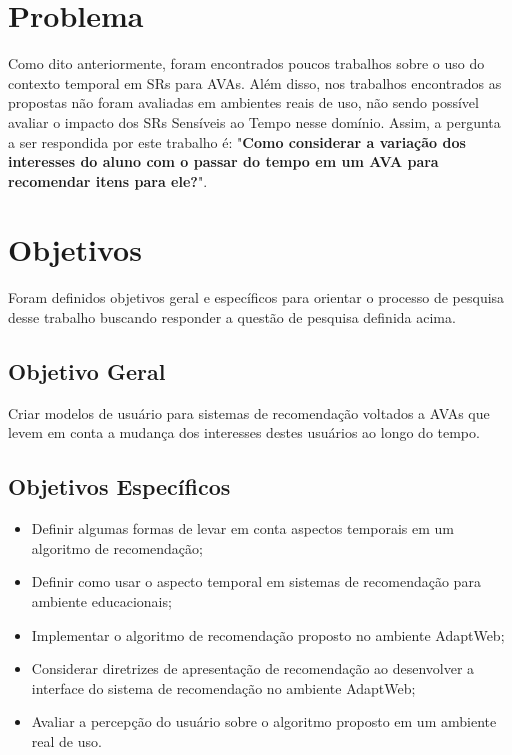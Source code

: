 \section{Problema}

Como dito anteriormente, foram encontrados poucos trabalhos sobre o uso do contexto temporal em SRs para AVAs. Além disso,
nos trabalhos encontrados as propostas não foram avaliadas em ambientes reais de uso, não sendo possível avaliar o
impacto dos SRs Sensíveis ao Tempo nesse domínio. Assim, a pergunta a ser respondida por este trabalho
é: "\textbf{Como considerar a variação dos interesses do aluno com o passar do tempo em um AVA para recomendar itens para ele?}".

\section{Objetivos}

Foram definidos objetivos geral e específicos para orientar o processo de pesquisa desse trabalho buscando responder a questão
de pesquisa definida acima.

\subsection{Objetivo Geral}

Criar modelos de usuário para sistemas de recomendação voltados a AVAs que levem em
conta a mudança dos interesses destes usuários ao longo do tempo.

\subsection{Objetivos Específicos}

\begin{itemize}
\item Definir algumas formas de levar em conta aspectos temporais em um algoritmo de recomendação;
\item Definir como usar o aspecto temporal em sistemas de recomendação para ambiente educacionais;
\item Implementar o algoritmo de recomendação proposto no ambiente AdaptWeb\textsuperscript{\textregistered};
\item Considerar diretrizes de apresentação de recomendação ao desenvolver a interface do sistema de recomendação
no ambiente AdaptWeb\textsuperscript{\textregistered};
\item Avaliar a percepção do usuário sobre o algoritmo proposto em um ambiente real de uso.
\end{itemize}

